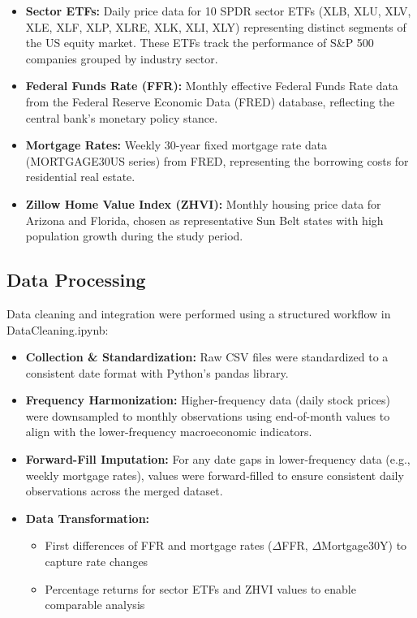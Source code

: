 \documentclass[12pt, stu, abstract]{apa7}
\begin{document}
\begin{itemize}
\item \textbf{Sector ETFs:} Daily price data for 10 SPDR sector ETFs (XLB, XLU, XLV, XLE, XLF, XLP, XLRE, XLK, XLI, XLY) representing distinct segments of the US equity market. These ETFs track the performance of S\&P 500 companies grouped by industry sector.

\item \textbf{Federal Funds Rate (FFR):} Monthly effective Federal Funds Rate data from the Federal Reserve Economic Data (FRED) database, reflecting the central bank's monetary policy stance.

\item \textbf{Mortgage Rates:} Weekly 30-year fixed mortgage rate data (MORTGAGE30US series) from FRED, representing the borrowing costs for residential real estate.

\item \textbf{Zillow Home Value Index (ZHVI):} Monthly housing price data for Arizona and Florida, chosen as representative Sun Belt states with high population growth during the study period.
\end{itemize}

\subsection{Data Processing}
Data cleaning and integration were performed using a structured workflow in DataCleaning.ipynb:

\begin{itemize}
\item \textbf{Collection \& Standardization:} Raw CSV files were standardized to a consistent date format with Python's pandas library.

\item \textbf{Frequency Harmonization:} Higher-frequency data (daily stock prices) were downsampled to monthly observations using end-of-month values to align with the lower-frequency macroeconomic indicators.

\item \textbf{Forward-Fill Imputation:} For any date gaps in lower-frequency data (e.g., weekly mortgage rates), values were forward-filled to ensure consistent daily observations across the merged dataset.

\item \textbf{Data Transformation:}
\begin{itemize}
    \item First differences of FFR and mortgage rates ($\Delta$FFR, $\Delta$Mortgage30Y) to capture rate changes
    \item Percentage returns for sector ETFs and ZHVI values to enable comparable analysis
\end{itemize}
\end{itemize}
\end{document}
